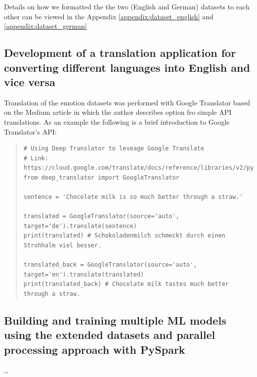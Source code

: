 \documentclass[11pt]{article}
\begin{document}
Details on how we formatted the the two (English and German) datasets to each other can be viewed in the Appendix \ref{appendix:dataset_english} and \ref{appendix:dataset_german}

\subsection{Development of a translation application for converting different languages into English and vice versa}
Translation of the emotion datasets was performed with Google Translator based on the Medium article\cite{Nidhaloff_how_to_translate_text_with_python} in which the author describes option fro simple API translations. As an example the following is a brief introduction to Google Translator's API:

\begin{quote}
\begin{verbatim}
# Using Deep Translator to leveage Google Translate
# Link: https://cloud.google.com/translate/docs/reference/libraries/v2/python
from deep_translator import GoogleTranslator

sentence = 'Chocolate milk is so much better through a straw.'

translated = GoogleTranslator(source='auto', target='de').translate(sentence)
print(translated) # Schokoladenmilch schmeckt durch einen Strohhalm viel besser.

translated_back = GoogleTranslator(source='auto', target='en').translate(translated)
print(translated_back) # Chocolate milk tastes much better through a straw.
\end{verbatim}
\end{quote}


\subsection{Building and training multiple ML models using the extended datasets and parallel processing approach with PySpark}
\ldots
\end{document}
